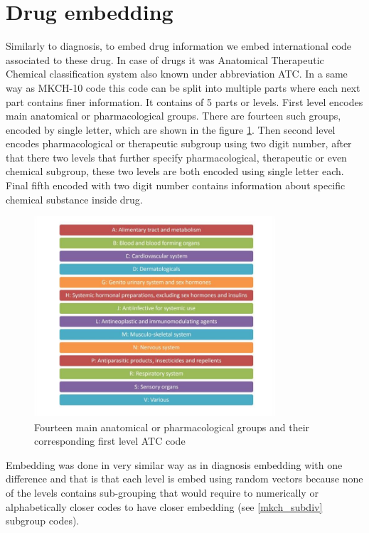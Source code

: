 \section{Drug embedding}

Similarly to diagnosis, to embed drug information we embed international code associated to these drug. In case of drugs it was Anatomical Therapeutic Chemical classification system also known under abbreviation ATC. In a same way as MKCH-10 code this code can be split into multiple parts where each next part contains finer information. It contains of 5 parts or levels. First level encodes main anatomical or pharmacological groups. There are fourteen such groups, encoded by single letter, which are shown in the figure \ref{fig:atc_l1}. Then second level encodes pharmacological or therapeutic subgroup using two digit number, after that there two levels that further specify pharmacological, therapeutic or even chemical subgroup, these two levels are both encoded using single letter each. Final fifth encoded with two digit number contains information about specific chemical substance inside drug.

\begin{figure}[!h]
	\centering
	
	\includegraphics[width=0.8\textwidth]{images/atc_l1_classification_who.jpg}
	
	\caption{Fourteen main anatomical or pharmacological groups and their corresponding first level ATC code \cite{atc_who}}
	\label{fig:atc_l1}
\end{figure}



Embedding was done in very similar way as in diagnosis embedding with one difference and that is that each level is embed using random vectors because none of the levels contains sub-grouping that would require to numerically or alphabetically closer codes to have closer embedding (see \ref{mkch_subdiv} subgroup codes).


